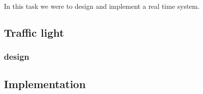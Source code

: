 In this task we were to design and implement a real time system.
\subsection{Traffic light}
\subsubsection{design}
\subsection{Implementation}